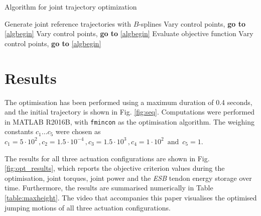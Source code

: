 \documentclass[letterpaper, 10 pt, conference]{ieeeconf}  %
\begin{document}
\begin{algorithm}[H]
	\caption{Algorithm for joint trajectory optimization} \label{algo}
	\begin{algorithmic}[1]
		 \STATE  Generate joint reference trajectories with $B$-splines \label{algbegin}
		  \ELSE \STATE Vary control points, \textbf{go to} \ref{algbegin}  \ENDIF
		   \ENDWHILE
		  \ELSE \STATE Vary control points, \textbf{go to} \ref{algbegin}  \ENDIF
		\STATE Evaluate objective function
		  \ELSE \STATE Vary control points, \textbf{go to} \ref{algbegin}  \ENDIF
	\end{algorithmic}
\end{algorithm}


\section{Results} \label{sec:results}
The optimisation has been performed using a maximum duration of 0.4 seconds, and the initial trajectory is shown in Fig. \ref{fig:seq}. Computations were performed in MATLAB R2016B, with \texttt{fmincon} as the optimisation algorithm. The weighing constants $c_1 \dots c_5$ were chosen as $c_1=5 \cdot 10^{2} \,, c_2=1.5 \cdot 10^{-4} \,, c_3=1.5 \cdot 10^{3} \,, c_4 = 1\cdot 10^{2} \, \text{ and } \, c_5 = 1$.

The results for all three actuation configurations are shown in Fig. \ref{fig:opt_results}, which reports the objective criterion values during the optimisation, joint torques, joint power and the \textit{ESB} tendon energy storage over time. Furthermore, the results are summarised numerically in Table \ref{table:maxheight}. The video that accompanies this paper visualises the optimised jumping motions of all three actuation configurations.
\end{document}
